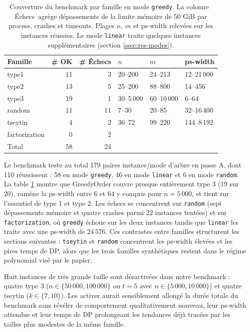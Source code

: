 \documentclass[11pt,a4paper]{report}
\theoremstyle{plain}
\theoremstyle{definition}
\begin{document}
\begin{table}[htbp]
\centering
\caption{Couverture du benchmark par famille en mode \texttt{greedy}.
La colonne \og\,Échecs\,\fg{} agrège dépassements de la limite
mémoire de 50 GiB par process, crashes et timeouts. Plages $n$, $m$
et ps-width relevées sur les instances réussies. Le mode
\texttt{linear} traite quelques instances supplémentaires
(section \ref{ssec:res-modes}).}
\label{tab:res-instances}
\begin{tabular}{lrrlll}
\toprule
Famille & \# OK & \# Échecs & $n$ & $m$ & ps-width \\
\midrule
type1         & 11 & 3  & 20--200    & 24--213    & 12--21\,000  \\
type2         & 13 & 5  & 25--200    & 88--800    & 14--456      \\
type3         & 19 & 1  & 30--5\,000 & 60--10\,000 & 6--64       \\
random        & 11 & 11 & 7--30      & 20--85     & 32--16\,400  \\
tseytin       & 4  & 2  & 36--72     & 99--220    & 144--8\,192  \\
factorization & 0  & 2  & {}         & {}         & {}           \\
\midrule
Total         & 58 & 24 & & & \\
\bottomrule
\end{tabular}
\end{table}

Le benchmark teste au total 179 paires instance/mode d'arbre en
passe A, dont 110 réussissent : 58 en mode \texttt{greedy}, 46 en
mode \texttt{linear} et 6 en mode \texttt{random}. La
table \ref{tab:res-instances} montre que GreedyOrder couvre presque
entièrement type 3 (19 sur 20), ramène
la ps-width entre $6$ et $64$ y compris pour $n = 5\,000$, et tient
sur l'essentiel de type 1 et type 2. Les échecs se concentrent sur
\texttt{random} (sept dépassements mémoire et quatre crashes
parmi 22 instances tentées) et sur \texttt{factorization}, où
\texttt{greedy} échoue sur les deux instances tandis que
\texttt{linear} les traite avec une ps-width de $24\,576$. Ces
contrastes entre familles structurent les sections suivantes :
\texttt{tseytin} et \texttt{random} concentrent les ps-width
élevées et les pires temps de DP, alors que les trois familles
synthétiques restent dans le régime polynomial visé par le
papier.

Huit instances de très grande taille sont désactivées dans notre
benchmark : quatre type 3 ($n \in \{50\,000, 100\,000\}$ ou $t = 5$
avec $n \in \{5\,000, 10\,000\}$) et quatre tseytin
($k \in \{7, 10\}$). Les activer aurait sensiblement allongé la
durée totale du benchmark sans révéler de comportement
qualitativement nouveau, leur ps-width attendue et leur temps de
DP prolongeant les tendances déjà tracées par les tailles plus
modestes de la même famille.
\end{document}
